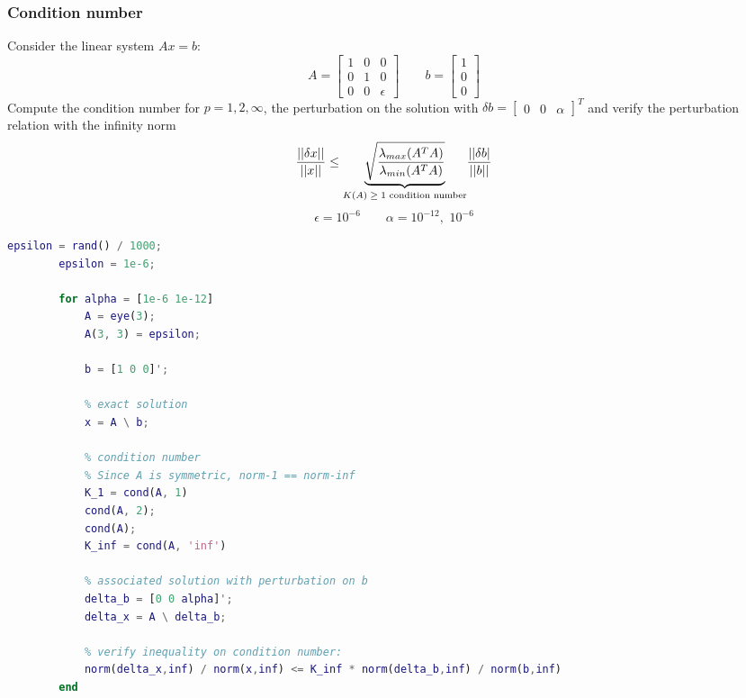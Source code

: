     \subsubsection{Condition number}
        Consider the linear system $Ax=b$:
        $$
        A=\begin{bmatrix}
            1 & 0 & 0\\
            0 & 1 & 0\\
            0 & 0 & \epsilon
        \end{bmatrix}
        \qquad
        b=\begin{bmatrix}
            1\\
            0\\
            0
        \end{bmatrix}
        $$
        Compute the condition number for $p=1,2,\infty$, the perturbation on the solution with $\delta b=\begin{bmatrix}
            0 & 0 & \alpha
        \end{bmatrix}^T$ and verify the perturbation relation with the infinity norm
        $$
        \frac{||\delta x||}{||x||}\leq
        \underlabel{
            \sqrt{\frac{
                \lambda_{max}(A^TA)
            }{\lambda_{min}(A^TA)}}
        }{$K(A)\geq 1$ condition number}    
        \frac{||\delta b|}{||b||}
        $$
        $$
        \epsilon=10^{-6}
        \qquad
        \alpha=10^{-12},\,\,10^{-6}
        $$
        \begin{lstlisting}[language=Matlab, escapeinside=`', gobble=8]
        epsilon = rand() / 1000;
        epsilon = 1e-6;
        
        for alpha = [1e-6 1e-12]
            A = eye(3);
            A(3, 3) = epsilon;
        
            b = [1 0 0]';
        
            % exact solution
            x = A \ b;
        
            % condition number
            % Since A is symmetric, norm-1 == norm-inf
            K_1 = cond(A, 1)
            cond(A, 2);
            cond(A);
            K_inf = cond(A, 'inf')
        
            % associated solution with perturbation on b
            delta_b = [0 0 alpha]';
            delta_x = A \ delta_b;
        
            % verify inequality on condition number:
            norm(delta_x,inf) / norm(x,inf) <= K_inf * norm(delta_b,inf) / norm(b,inf)
        end
        \end{lstlisting}

